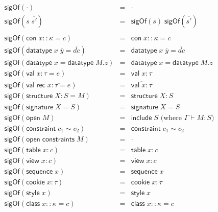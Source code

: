 \documentclass{article}
\newcommand{\mt}[1]{\mathsf{#1}}
\begin{document}
\begin{eqnarray*}
  \mt{sigOf}(\cdot) &=& \cdot \\
  \mt{sigOf}(s \; \overline{s'}) &=& \mt{sigOf}(s) \; \mt{sigOf}(\overline{s'}) \\
  \\
  \mt{sigOf}(\mt{con} \; x :: \kappa = c) &=& \mt{con} \; x :: \kappa = c \\
  \mt{sigOf}(\mt{datatype} \; x \; \overline{y} = \overline{dc}) &=& \mt{datatype} \; x \; \overline{y} = \overline{dc} \\
  \mt{sigOf}(\mt{datatype} \; x = \mt{datatype} \; M.z) &=& \mt{datatype} \; x = \mt{datatype} \; M.z \\
  \mt{sigOf}(\mt{val} \; x : \tau = e) &=& \mt{val} \; x : \tau \\
  \mt{sigOf}(\mt{val} \; \mt{rec} \; \overline{x : \tau = e}) &=& \overline{\mt{val} \; x : \tau} \\
  \mt{sigOf}(\mt{structure} \; X : S = M) &=& \mt{structure} \; X : S \\
  \mt{sigOf}(\mt{signature} \; X = S) &=& \mt{signature} \; X = S \\
  \mt{sigOf}(\mt{open} \; M) &=& \mt{include} \; S \textrm{ (where $\Gamma \vdash M : S$)} \\
  \mt{sigOf}(\mt{constraint} \; c_1 \sim c_2) &=& \mt{constraint} \; c_1 \sim c_2 \\
  \mt{sigOf}(\mt{open} \; \mt{constraints} \; M) &=& \cdot \\
  \mt{sigOf}(\mt{table} \; x : c) &=& \mt{table} \; x : c \\
  \mt{sigOf}(\mt{view} \; x : c) &=& \mt{view} \; x : c \\
  \mt{sigOf}(\mt{sequence} \; x) &=& \mt{sequence} \; x \\
  \mt{sigOf}(\mt{cookie} \; x : \tau) &=& \mt{cookie} \; x : \tau \\
  \mt{sigOf}(\mt{style} \; x) &=& \mt{style} \; x \\
  \mt{sigOf}(\mt{class} \; x :: \kappa = c) &=& \mt{class} \; x :: \kappa = c \\
\end{eqnarray*}
\end{document}
